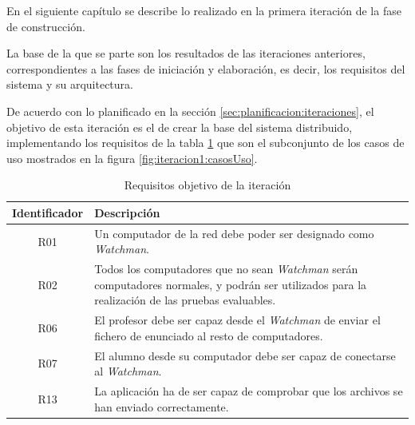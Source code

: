 
\label{chap:iteracion1}

\chaptertoc

En el siguiente capítulo se describe lo realizado en la primera iteración de la fase de construcción.
\newline

La base de la que se parte son los resultados de las iteraciones anteriores, correspondientes a las fases de iniciación y elaboración, es decir, los requisitos del sistema y su arquitectura.
\newline

De acuerdo con lo planificado en la sección \ref{sec:planificacion:iteraciones}, el objetivo de esta iteración es el de crear la base del sistema distribuido, implementando los requisitos de la tabla \ref{tabla:iteracion1:requisitosObjetivo} que son el subconjunto de los casos de uso mostrados en la figura \ref{fig:iteracion1:casosUso}.
\newline

\begin{table}
    \begin{tabular}{|c|p{10cm}|}
        \hline
        \textbf{Identificador} & \textbf{Descripción}
        \\ \hline

        R01 & Un computador de la red debe poder ser designado como \emph{Watchman}.
        \\ \hline

        R02 & Todos los computadores que no sean \emph{Watchman} serán computadores
        normales, y podrán ser utilizados para la realización de las pruebas evaluables.
        \\ \hline

        R06 & El profesor debe ser capaz desde el \emph{Watchman} de enviar el fichero de enunciado al resto de computadores.
        \\ \hline

        R07 & El alumno desde su computador debe ser capaz de conectarse al \emph{Watchman}.
        \\ \hline

        R13 & La aplicación ha de ser capaz de comprobar que los archivos se han enviado correctamente.
        \\ \hline

    \end{tabular}
    \label{tabla:iteracion1:requisitosObjetivo}
    \caption{Requisitos objetivo de la iteración}
\end{table}

